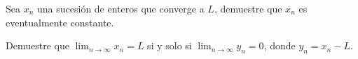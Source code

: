 \documentclass{ayudantia}
\begin{document}
\begin{prob}
    Sea \(x_n\) una sucesión de enteros que converge a \(L\), demuestre que \(x_n\) es eventualmente constante.
\end{prob}

\begin{ans}
    \begin{sol}

\end{sol}
\end{ans}


\begin{prob}
    Demuestre que \(\lim_{n\rightarrow\infty}x_n=L\) si y solo si \(\lim_{n\rightarrow\infty}y_n=0\), donde \(y_n=x_n-L\).
\end{prob}

\begin{ans}
    \begin{sol}

\end{sol}
\end{ans}
\end{document}
